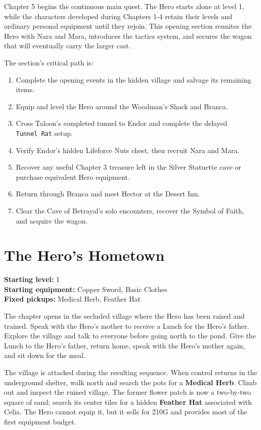 \documentclass[
  american,
  10pt,
  letterpaper,
  oneside,
  open=any]{scrreprt}
\providecommand{\tightlist}{%
  \setlength{\itemsep}{0pt}\setlength{\parskip}{0pt}}
\begin{document}
Chapter 5 begins the continuous main quest. The Hero starts alone at
level 1, while the characters developed during Chapters 1-4 retain their
levels and ordinary personal equipment until they rejoin. This opening
section reunites the Hero with Nara and Mara, introduces the tactics
system, and secures the wagon that will eventually carry the larger
cast.

The section's critical path is:

\begin{enumerate}
\def\labelenumi{\arabic{enumi}.}
\tightlist
\item
  Complete the opening events in the hidden village and salvage its
  remaining items.
\item
  Equip and level the Hero around the Woodman's Shack and Branca.
\item
  Cross Taloon's completed tunnel to Endor and complete the delayed
  \texttt{Tunnel\ Rat} setup.
\item
  Verify Endor's hidden Lifeforce Nuts chest, then recruit Nara and
  Mara.
\item
  Recover any useful Chapter 3 treasure left in the Silver Statuette
  cave or purchase equivalent Hero equipment.
\item
  Return through Branca and meet Hector at the Desert Inn.
\item
  Clear the Cave of Betrayal's solo encounters, recover the Symbol of
  Faith, and acquire the wagon.
\end{enumerate}

\section{The Hero's Hometown}\label{the-heros-hometown}

\textbf{Starting level:} 1\\
\textbf{Starting equipment:} Copper Sword, Basic Clothes\\
\textbf{Fixed pickups:} Medical Herb, Feather Hat

The chapter opens in the secluded village where the Hero has been raised
and trained. Speak with the Hero's mother to receive a Lunch for the
Hero's father. Explore the village and talk to everyone before going
north to the pond. Give the Lunch to the Hero's father, return home,
speak with the Hero's mother again, and sit down for the meal.

The village is attacked during the resulting sequence. When control
returns in the underground shelter, walk north and search the pots for a
\textbf{Medical Herb}. Climb out and inspect the ruined village. The
former flower patch is now a two-by-two square of sand; search its
center tiles for a hidden \textbf{Feather Hat} associated with Celia.
The Hero cannot equip it, but it sells for 210G and provides most of the
first equipment budget.
\end{document}

